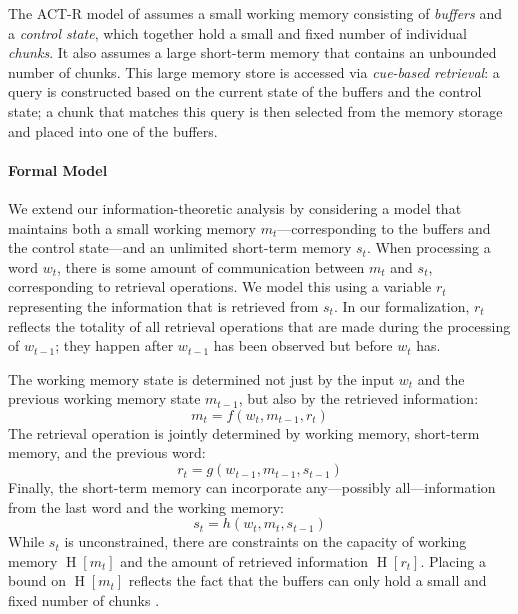 \documentclass[11pt,letterpaper]{article}
\begin{document}
The ACT-R model of \cite{lewis-activation-based-2005} assumes a small working memory consisting of \emph{buffers} and a \emph{control state}, which together hold a small and fixed number of individual \emph{chunks}.
It also assumes a large short-term memory that contains an unbounded number of chunks.
This large memory store is accessed via \emph{cue-based retrieval}: a query is constructed based on the current state of the buffers and the control state; a chunk that matches this query is then selected from the memory storage and placed into one of the buffers.

\paragraph{Formal Model}
We extend our information-theoretic analysis by considering a model that maintains both a small working memory $m_t$---corresponding to the buffers and the control state---and an unlimited short-term memory $s_t$.
When processing a word $w_t$, there is some amount of communication between $m_t$ and $s_t$, corresponding to retrieval operations.
We model this using a variable $r_t$ representing the information that is retrieved from $s_t$.
In our formalization, $r_t$ reflects the totality of all retrieval operations that are made during the processing of $w_{t-1}$; they happen after $w_{t-1}$ has been observed but before $w_t$ has.

The working memory state is determined not just by the input $w_t$ and the previous working memory state $m_{t-1}$, but also by the retrieved information:
\begin{equation}
	m_t = f(w_t, m_{t-1}, r_t) 
\end{equation}
The retrieval operation is jointly determined by working memory, short-term memory, and the previous word:
\begin{equation}\label{eq:rt}
	r_t = g(w_{t-1}, m_{t-1}, s_{t-1}) 
\end{equation}
Finally, the short-term memory can incorporate any---possibly all---information from the last word and the working memory:
\begin{equation}
	s_t = h(w_{t}, m_{t}, s_{t-1}) 
\end{equation}
While $s_t$ is unconstrained, there are constraints on the capacity of working memory $\operatorname{H}[m_t]$ and the amount of retrieved information $\operatorname{H}[r_t]$.
Placing a bound on $\operatorname{H}[m_t]$ reflects the fact that the buffers can only hold a small and fixed number of chunks \citep{lewis-activation-based-2005}.
\end{document}
